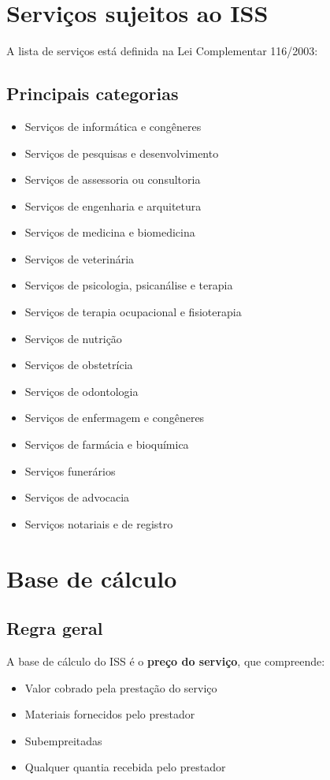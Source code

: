 \documentclass[12pt,a4paper]{article}
\begin{document}
\section{Serviços sujeitos ao ISS}

A lista de serviços está definida na Lei Complementar 116/2003:

\subsection{Principais categorias}
\begin{itemize}
    \item Serviços de informática e congêneres
    \item Serviços de pesquisas e desenvolvimento
    \item Serviços de assessoria ou consultoria
    \item Serviços de engenharia e arquitetura
    \item Serviços de medicina e biomedicina
    \item Serviços de veterinária
    \item Serviços de psicologia, psicanálise e terapia
    \item Serviços de terapia ocupacional e fisioterapia
    \item Serviços de nutrição
    \item Serviços de obstetrícia
    \item Serviços de odontologia
    \item Serviços de enfermagem e congêneres
    \item Serviços de farmácia e bioquímica
    \item Serviços funerários
    \item Serviços de advocacia
    \item Serviços notariais e de registro
\end{itemize}

\section{Base de cálculo}

\subsection{Regra geral}
A base de cálculo do ISS é o \textbf{preço do serviço}, que compreende:
\begin{itemize}
    \item Valor cobrado pela prestação do serviço
    \item Materiais fornecidos pelo prestador
    \item Subempreitadas
    \item Qualquer quantia recebida pelo prestador
\end{itemize}
\end{document}
